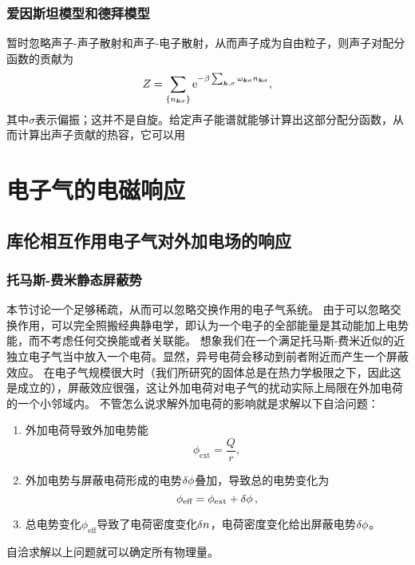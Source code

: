 \documentclass[hyperref, UTF8, a4paper]{ctexart}
\newcommand*{\ee}{\mathrm{e}}
\begin{document}
\subsubsection{爱因斯坦模型和德拜模型}

暂时忽略声子-声子散射和声子-电子散射，从而声子成为自由粒子，则声子对配分函数的贡献为
\begin{equation}
    Z = \sum_{\{n_{\vb*{k} \sigma}\}} \ee^{-\beta \sum_{\vb*{k}, \sigma} \omega_{\vb*{k} \sigma} n_{\vb*{k} \sigma}},
\end{equation}
其中$\sigma$表示偏振；这并不是自旋。给定声子能谱就能够计算出这部分配分函数，从而计算出声子贡献的热容，它可以用

\section{电子气的电磁响应}

\subsection{库伦相互作用电子气对外加电场的响应}\label{sec:ext-e}

\subsubsection{托马斯-费米静态屏蔽势}

本节讨论一个足够稀疏，从而可以忽略交换作用的电子气系统。
由于可以忽略交换作用，可以完全照搬经典静电学，即认为一个电子的全部能量是其动能加上电势能，而不考虑任何交换能或者关联能。
想象我们在一个满足托马斯-费米近似的近独立电子气当中放入一个电荷。显然，异号电荷会移动到前者附近而产生一个屏蔽效应。
在电子气规模很大时（我们所研究的固体总是在热力学极限之下，因此这是成立的），屏蔽效应很强，这让外加电荷对电子气的扰动实际上局限在外加电荷的一个小邻域内。
不管怎么说求解外加电荷的影响就是求解以下自洽问题：
\begin{enumerate}
    \item 外加电荷导致外加电势能
    \begin{equation}
        \phi_\text{ext} = \frac{Q}{r},
    \end{equation}
    \item 外加电势与屏蔽电荷形成的电势$\var{\phi}$叠加，导致总的电势变化为
    \begin{equation}
        \phi_\text{eff} = \phi_\text{ext} + \var{\phi},
    \end{equation}
    \item 总电势变化$\phi_\text{eff}$导致了电荷密度变化$\var{n}$，电荷密度变化给出屏蔽电势$\var{\phi}$。
\end{enumerate}
自洽求解以上问题就可以确定所有物理量。
\end{document}

